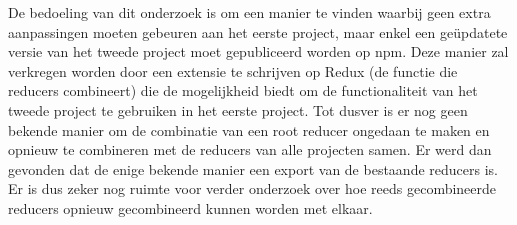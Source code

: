 De bedoeling van dit onderzoek is om een manier te vinden waarbij geen extra aanpassingen moeten gebeuren aan het eerste project, maar enkel een geüpdatete versie van het tweede project moet gepubliceerd worden op npm. Deze manier zal verkregen worden door een extensie te schrijven op Redux (de functie die reducers combineert) die de mogelijkheid biedt om de functionaliteit van het tweede project te gebruiken in het eerste project. Tot dusver is er nog geen bekende manier om de combinatie van een root reducer ongedaan te maken en opnieuw te combineren met de reducers van alle projecten samen. Er werd dan gevonden dat de enige bekende manier een export van de bestaande reducers is. Er is dus zeker nog ruimte voor verder onderzoek over hoe reeds gecombineerde reducers opnieuw gecombineerd kunnen worden met elkaar.
